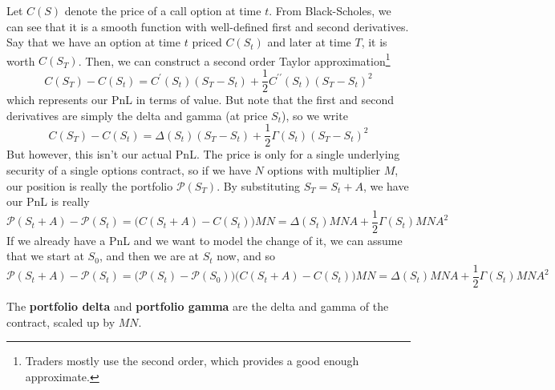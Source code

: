 \documentclass{article}
\begin{document}
    Let $C(S)$ denote the price of a call option at time $t$. From Black-Scholes, we can see that it is a smooth function with well-defined first and second derivatives. Say that we have an option at time $t$ priced $C(S_t)$ and later at time $T$, it is worth $C(S_T)$. Then, we can construct a second order Taylor approximation\footnote{Traders mostly use the second order, which provides a good enough approximate. }
    \begin{equation}
      C(S_T) - C(S_t) = C^\prime (S_t) (S_T - S_t) + \frac{1}{2} C^{\prime\prime} (S_t) (S_T - S_t)^2
    \end{equation}
    which represents our PnL in terms of value. But note that the first and second derivatives are simply the delta and gamma (at price $S_t$), so we write
    \begin{equation}
      C(S_T) - C(S_t) = \Delta (S_t) (S_T - S_t) + \frac{1}{2} \Gamma (S_t) (S_T - S_t)^2
    \end{equation}
    But however, this isn't our actual PnL. The price is only for a single underlying security of a single options contract, so if we have $N$ options with multiplier $M$, our position is really the portfolio $\mathcal{P}(S_T)$. By substituting $S_T = S_t + A$, we have
    our PnL is really
    \begin{equation}
      \mathcal{P}(S_t + A) - \mathcal{P} (S_t) = \big( C(S_t + A) - C(S_t) \big) M N = \Delta (S_t) M N A + \frac{1}{2} \Gamma (S_t) M N A^2
    \end{equation}
    If we already have a PnL and we want to model the change of it, we can assume that we start at $S_0$, and then we are at $S_t$ now, and so 
    \begin{equation}
      \mathcal{P}(S_t + A) - \mathcal{P} (S_t) = \big( \mathcal{P}(S_t) - \mathcal{P}(S_0) \big) \big( C(S_t + A) - C(S_t) \big) M N = \Delta (S_t) M N A + \frac{1}{2} \Gamma (S_t) M N A^2
    \end{equation}

    \begin{definition}
      The \textbf{portfolio delta} and \textbf{portfolio gamma} are the delta and gamma of the contract, scaled up by $MN$.
    \end{definition}
\end{document}
